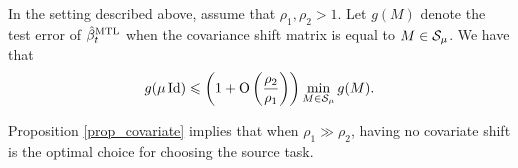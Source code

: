\begin{proposition}\label{prop_covariate}
	In the setting described above, assume that $\rho_1, \rho_2>1$.
	Let $g(M)$ denote the test error of $\hat{\beta}_t^{\text{MTL}}$ when the covariance shift matrix is equal to $M\in\mathcal{S}_{\mu}$.
	We have that \[ g(\mu\operatorname{Id}) \leqslant \left({1+ \operatorname{O}\left(\frac{\rho_2}{\rho_1}  \right)}\right) \min_{M\in\mathcal{S}_{\mu}} g(M). \]
\end{proposition}
Proposition \ref{prop_covariate} implies that when $\rho_1\gg \rho_2$, having no covariate shift is the optimal choice for choosing the source task.



